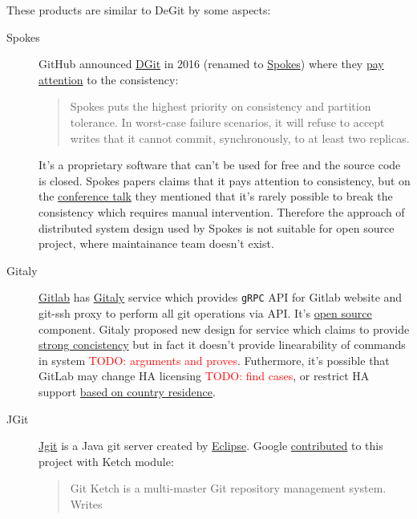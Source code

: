 \documentclass[acmlarge, screen, nonacm]{acmart}
\newcommand{\code}[1]{\texttt{#1}}
\newcommand{\todo}[1]{\textcolor{red}{TODO: #1}}
\begin{document}
These products are similar to DeGit by some aspects:
\begin{description}
  \item[Spokes]
    GitHub announced \href{https://github.blog/2016-04-05-introducing-dgit/}{DGit}
    in 2016 (renamed to \href{https://github.blog/2016-09-07-building-resilience-in-spokes/}{Spokes})
    where they \href{https://github.blog/2016-09-07-building-resilience-in-spokes/#defining-resilience}{pay attention}
    to the consistency:
    \begin{quote}
      Spokes puts the highest priority on consistency and partition tolerance.
      In worst-case failure scenarios, it will refuse to accept writes that it cannot commit,
      synchronously, to at least two replicas.
    \end{quote}
    It's a proprietary software that can't be used for free and the source code is closed.
    Spokes papers claims that it pays attention to consistency, but on the
    \href{https://www.youtube.com/watch?v=DY0yNRNkYb0}{conference talk} they mentioned that
    it's rarely possible to break the consistency which requires manual intervention.
    Therefore the approach of distributed system design used by Spokes is not suitable for open
    source project, where maintainance team doesn't exist.
  \item[Gitaly]
    \href{https://docs.gitlab.com/ee/README.html}{Gitlab} has
    \href{https://docs.gitlab.com/ee/administration/gitaly/}{Gitaly} service which provides
    \code{gRPC} API for Gitlab website and git-ssh proxy to perform all git operations via API.
    It's \href{https://gitlab.com/gitlab-org/gitaly}{open source} component.
    Gitaly proposed new design for service which claims to provide
    \href{https://gitlab.com/gitlab-org/gitaly/-/blob/master/doc/design\_ha.md\#strong-consistency-design}{strong concistency}
    but in fact it doesn't provide linearability of commands in system \todo{arguments and proves}.
    Futhermore, it's possible that GitLab may change HA licensing \todo{find cases},
    or restrict HA support \href{https://news.ycombinator.com/item?id=21437334}{based on country residence}.
  \item[JGit]
    \href{https://www.eclipse.org/jgit/}{Jgit} is a Java git server created by \href{https://www.eclipse.org/}{Eclipse}.
    Google \href{https://www.eclipse.org//lists/jgit-dev/msg03073.html}{contributed} to this project with Ketch module:
    \begin{quote}
      Git Ketch is a multi-master Git repository management system. Writes

\end{quote}
\end{description}
\end{document}
